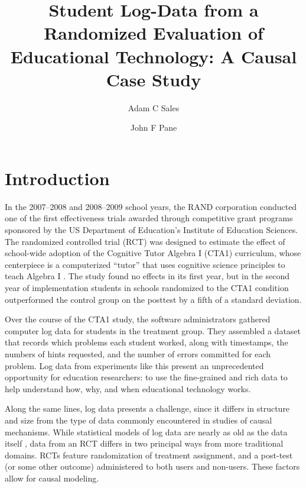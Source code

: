 \documentclass{article}
\title{Student Log-Data from a Randomized Evaluation of Educational
  Technology: A Causal Case Study}
\author[1]{Adam C Sales}
\author[2]{John F Pane}
\affil[1]{University of Texas, Austin, TX}
\affil[2]{RAND Corporation, Pittsburgh, PA}
\begin{document}
\maketitle

\section{Introduction}
In the 2007--2008 and 2008--2009 school years, the RAND corporation
conducted one of the first effectiveness trials awarded through
competitive grant programs sponsored by the US Department of
Education's Institute of Education Sciences.  The randomized
controlled trial (RCT) was
designed to estimate the effect of school-wide adoption of the
Cognitive Tutor Algebra I (CTA1) curriculum, whose centerpiece is a
computerized ``tutor'' that uses cognitive science principles to teach
Algebra I \citep{anderson1985intelligent}.
The study \citep{pane2014effectiveness} found no effects in its first year, but in
the second year of implementation students in schools randomized to
the CTA1 condition outperformed the control group on the posttest by a fifth of a
standard deviation.

Over the course of the CTA1 study, the software administrators
gathered computer log data for students in the treatment group.
They assembled a dataset that records which problems each student
worked, along with timestamps, the numbers of hints requested, and the
number of errors committed for each problem.
Log data from experiments like this present an unprecedented
opportunity for education researchers:
to use the fine-grained and rich data to
help understand how, why, and when educational technology works.

Along the same lines, log data presents a challenge, since it differs in
structure and size from the type of data commonly encountered in
studies of causal mechanisms.
While statistical models of log data are nearly as old as the data itself
\citep[e.g.][]{corbett1994knowledge}, data from an RCT differs in
two principal ways from more traditional domains.
RCTs feature randomization of treatment assignment, and a post-test
(or some other outcome) administered to both users and non-users.
These factors allow for causal modeling.
\end{document}
